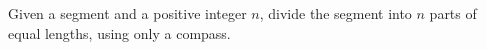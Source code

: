 Given a segment and a positive integer $n$,
divide the segment into $n$ parts of equal lengths,
using only a compass.

